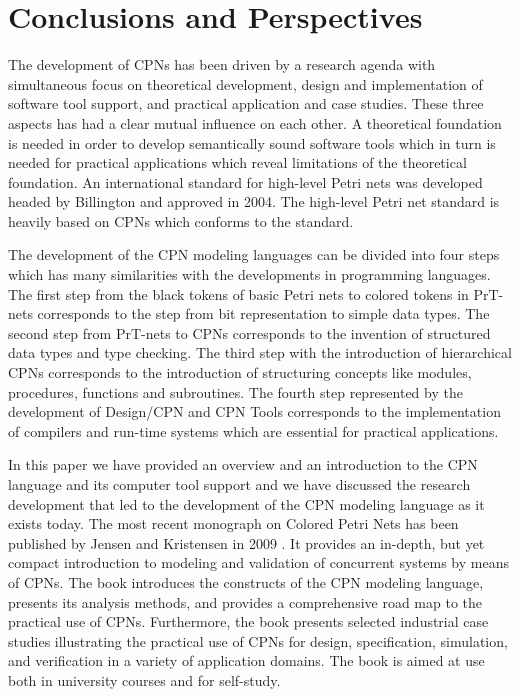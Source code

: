\section{Conclusions and Perspectives}

The development of CPNs has been driven by a research agenda with
simultaneous focus on theoretical development, design and
implementation of software tool support, and practical application and
case studies. These three aspects has had a clear mutual influence on
each other. A theoretical foundation is needed in order to develop
semantically sound software tools which in turn is needed for
practical applications which reveal limitations of the theoretical
foundation. An international standard for high-level Petri nets was
developed headed by Billington \cite{hcpnstandard} and approved in
2004. The high-level Petri net standard is heavily based on CPNs which
conforms to the standard.


The development of the CPN modeling languages can be divided into four
steps which has many similarities with the developments in programming
languages. The first step from the black tokens of basic Petri nets to
colored tokens in PrT-nets corresponds to the step from bit
representation to simple data types. The second step from PrT-nets to
CPNs corresponds to the invention of structured data types and type
checking. The third step with the introduction of hierarchical CPNs
corresponds to the introduction of structuring concepts like modules,
procedures, functions and subroutines. The fourth step represented by
the development of Design/CPN and CPN Tools corresponds to the
implementation of compilers and run-time systems which are essential
for practical applications.

In this paper we have provided an overview and an introduction to the
CPN language and its computer tool support and we have discussed the
research development that led to the development of the CPN modeling
language as it exists today. The most recent monograph on Colored
Petri Nets has been published by Jensen and Kristensen in 2009
\cite{newcpnbook}. It provides an in-depth, but yet compact
introduction to modeling and validation of concurrent systems by means
of CPNs. The book introduces the constructs of the CPN modeling
language, presents its analysis methods, and provides a comprehensive
road map to the practical use of CPNs. Furthermore, the book presents
selected industrial case studies illustrating the practical use of
CPNs for design, specification, simulation, and verification in a
variety of application domains. The book is aimed at use both in
university courses and for self-study.

